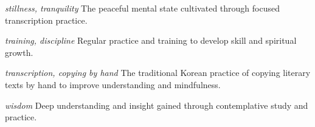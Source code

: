 \textbf{} \textit{stillness, tranquility}
The peaceful mental state cultivated through focused transcription practice.
\vspace{12pt}

\textbf{} \textit{training, discipline}
Regular practice and training to develop skill and spiritual growth.
\vspace{12pt}

\textbf{} \textit{transcription, copying by hand}
The traditional Korean practice of copying literary texts by hand to improve understanding and mindfulness.
\vspace{12pt}

\textbf{} \textit{wisdom}
Deep understanding and insight gained through contemplative study and practice.
\vspace{12pt}
